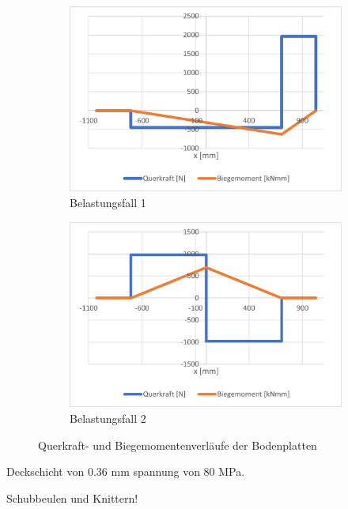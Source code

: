 \begin{figure}[!ht]
  \centering
    \begin{subfigure}{.5\textwidth}
      \centering
      \includegraphics[width=.98\linewidth]{04_figures/Boden QM1.png}
      \caption{Belastungsfall 1}
      \label{Belastungsfall 1}
    \end{subfigure}%
    \begin{subfigure}{.5\textwidth}
      \centering
      \includegraphics[width=.98\linewidth]{04_figures/Boden QM2.png}
      \caption{Belastungsfall 2}
      \label{Belastungsfall 2}
    \end{subfigure}%
  \caption{Querkraft- und Biegemomentenverläufe der Bodenplatten}
\label{Boden QB}
\end{figure}

Deckschicht von 0.36 mm spannung von 80 MPa. 

Schubbeulen und Knittern!


